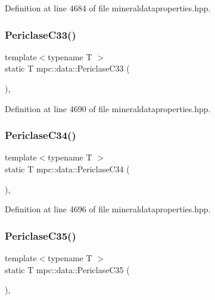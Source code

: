 Definition at line 4684 of file mineraldataproperties.\+hpp.

\mbox{\label{namespacempc_1_1data_a46951e44597ab9fd5abf95a06e45d396}} 
\subsubsection{\texorpdfstring{Periclase\+C33()}{PericlaseC33()}}
{\footnotesize\ttfamily template$<$typename T $>$ \\
static T mpc\+::data\+::\+Periclase\+C33 (\begin{DoxyParamCaption}{ }\end{DoxyParamCaption})\hspace{0.3cm}{\ttfamily [inline]}, {\ttfamily [static]}}



Definition at line 4690 of file mineraldataproperties.\+hpp.

\mbox{\label{namespacempc_1_1data_ab0d28c36c419acfa865018a341f45e5d}} 
\subsubsection{\texorpdfstring{Periclase\+C34()}{PericlaseC34()}}
{\footnotesize\ttfamily template$<$typename T $>$ \\
static T mpc\+::data\+::\+Periclase\+C34 (\begin{DoxyParamCaption}{ }\end{DoxyParamCaption})\hspace{0.3cm}{\ttfamily [inline]}, {\ttfamily [static]}}



Definition at line 4696 of file mineraldataproperties.\+hpp.

\mbox{\label{namespacempc_1_1data_a253a75bbdb175532a18fc3653eb819be}} 
\subsubsection{\texorpdfstring{Periclase\+C35()}{PericlaseC35()}}
{\footnotesize\ttfamily template$<$typename T $>$ \\
static T mpc\+::data\+::\+Periclase\+C35 (\begin{DoxyParamCaption}{ }\end{DoxyParamCaption})\hspace{0.3cm}{\ttfamily [inline]}, {\ttfamily [static]}}




